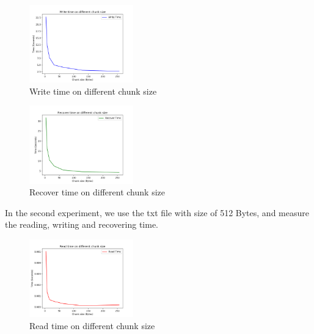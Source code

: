 \documentclass[journal]{IEEEtran}
\begin{document}
\begin{figure}[htbp]

	\centering

	\captionsetup{justification=centering}

	\includegraphics[width=0.4\textwidth]{fig/result_write.png}

	\caption{Write time on different chunk size}

\end{figure}


\begin{figure}[]

	\centering

	\captionsetup{justification=centering}

	\includegraphics[width=0.4\textwidth]{fig/result_recover.png}

	\caption{Recover time on different chunk size}

\end{figure}


In the second experiment, we use the txt file with size of 512 Bytes, and measure the reading, writing and recovering time.


\begin{figure}[H]

	\centering

	\captionsetup{justification=centering}

	\includegraphics[width=0.4\textwidth]{fig/result_read_small.png}

	\caption{Read time on different chunk size}

\end{figure}
\end{document}
